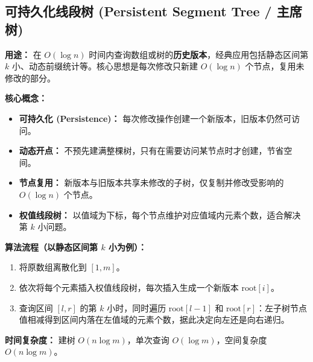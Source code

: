 \subsection{可持久化线段树 (Persistent Segment Tree / 主席树)}

\textbf{用途：}
在 $O(\log n)$ 时间内查询数组或树的\textbf{历史版本}，经典应用包括静态区间第 $k$ 小、动态前缀统计等。核心思想是每次修改只新建 $O(\log n)$ 个节点，复用未修改的部分。

\textbf{核心概念：}
\begin{itemize}
  \item \textbf{可持久化 (Persistence)：} 每次修改操作创建一个新版本，旧版本仍然可访问。
  \item \textbf{动态开点：} 不预先建满整棵树，只有在需要访问某节点时才创建，节省空间。
  \item \textbf{节点复用：} 新版本与旧版本共享未修改的子树，仅复制并修改受影响的 $O(\log n)$ 个节点。
  \item \textbf{权值线段树：} 以值域为下标，每个节点维护对应值域内元素个数，适合解决第 $k$ 小问题。
\end{itemize}

\textbf{算法流程（以静态区间第 $k$ 小为例）：}
\begin{enumerate}
  \item 将原数组离散化到 $[1, m]$。
  \item 依次将每个元素插入权值线段树，每次插入生成一个新版本 $\text{root}[i]$。
  \item 查询区间 $[l, r]$ 的第 $k$ 小时，同时遍历 $\text{root}[l-1]$ 和 $\text{root}[r]$：左子树节点值相减得到区间内落在左值域的元素个数，据此决定向左还是向右递归。
\end{enumerate}

\textbf{时间复杂度：}
建树 $O(n\log m)$，单次查询 $O(\log m)$，空间复杂度 $O(n\log m)$。



